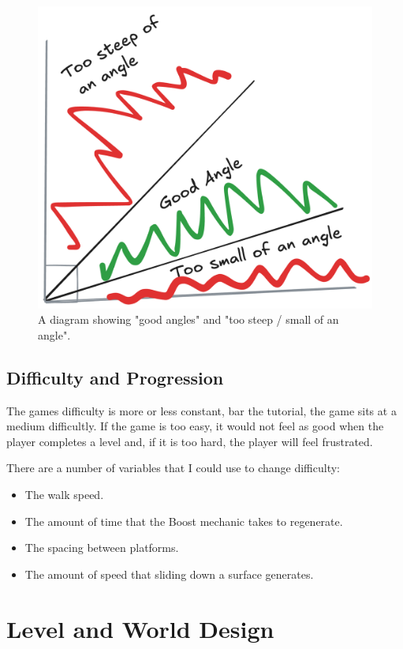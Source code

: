 \documentclass[12pt]{article}
\begin{document}
\begin{itemize}[]
\begin{figure}[h]
			\includegraphics[scale=0.1]{angleSteepness}
			\centering
			\caption{A diagram showing "good angles" and "too steep / small of an angle".}
		\end{figure}
	\end{itemize}

	\subsection{Difficulty and Progression}
	The games difficulty is more or less constant, bar the tutorial, the game sits at a medium difficultly. If the game is too easy, it would not feel as good when the player completes a level and, if it is too hard, the player will feel frustrated.

	There are a number of variables that I could use to change difficulty:
	\begin{itemize}
	  \item The walk speed.
	  \item The amount of time that the Boost mechanic takes to regenerate.
	  \item The spacing between platforms.
	  \item The amount of speed that sliding down a surface generates.
	\end{itemize}

	\section{Level and World Design}
\end{document}
